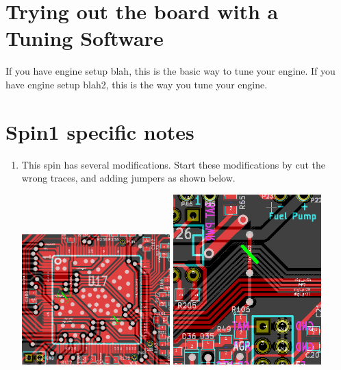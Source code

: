 \documentclass[12pt,a4paper,titlepage]{article}
\begin{document}
\section{Trying out the board with a Tuning Software}

If you have engine setup blah, this is the basic way to tune your engine.
If you have engine setup blah2, this is the way you tune your engine.

\section{Spin1 specific notes}

\begin{enumerate}
\item This spin has several modifications. Start these modifications by cut the wrong traces, and adding jumpers as shown below.

\begin{center}
\includegraphics[width = 0.45\textwidth]{images/MCU_VDD_traces.png}
%
\includegraphics[width = 0.45\textwidth]{images/BRV_hack.png}


\end{center}
\end{enumerate}
\end{document}
